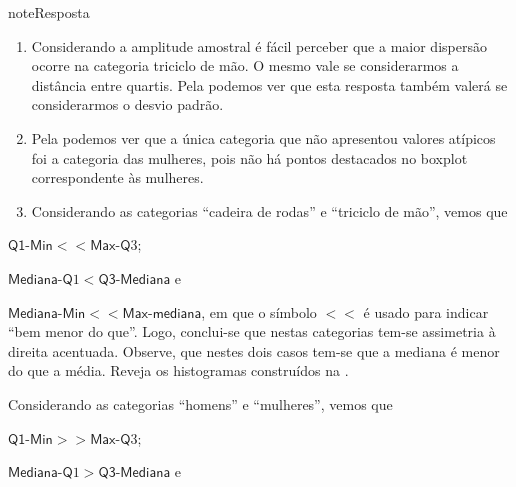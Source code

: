 \begin{sphinxadmonition}{note}{Resposta}
\begin{enumerate}
\item {} 
Considerando a amplitude amostral é fácil perceber que a maior dispersão ocorre na categoria triciclo de mão. O mesmo vale se considerarmos a distância entre quartis. Pela {\hyperref[\detokenize{PE104-7:fig-medidasresumo4categorias}]{}} podemos ver que esta resposta também valerá se considerarmos o desvio padrão.

\item {} 
Pela {\hyperref[\detokenize{PE104-7:fig-boxplotsmaratona}]{}} podemos ver que a única categoria que não apresentou valores atípicos foi a categoria das mulheres, pois não há pontos destacados no boxplot correspondente às mulheres.

\item {} 
Considerando as categorias “cadeira de rodas” e “triciclo de mão”, vemos que

\end{enumerate}

\(\textsf{Q1-Min}<< \textsf{Max-Q}3\);

\(\textsf{Mediana-Q}1< \textsf{Q3-Mediana}\) e

\(\textsf{Mediana-Min} <<\textsf{Max-mediana}\), em que o símbolo \(<<\) é usado para indicar “bem menor do que”.
Logo, conclui-se que nestas categorias tem-se assimetria à direita acentuada. Observe, que nestes dois casos tem-se que a mediana é menor do que a média. Reveja os histogramas construídos na .

Considerando as categorias “homens” e “mulheres”, vemos que

\(\textsf{Q1-Min}>> \textsf{Max-Q}3\);

\(\textsf{Mediana-Q}1 > \textsf{Q3-Mediana}\) e


\end{sphinxadmonition}
